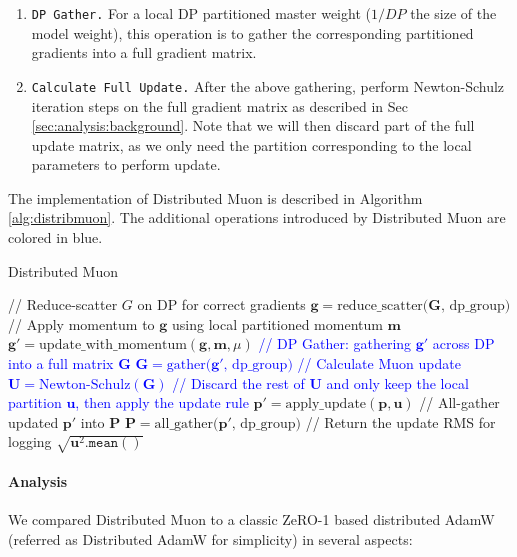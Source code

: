 \begin{enumerate}
    \item \texttt{DP Gather.} For a local DP partitioned master weight ($1/DP$ the size of the model weight), this operation is to gather the corresponding partitioned gradients into a full gradient matrix. 
    
    \item \texttt{Calculate Full Update.} After the above gathering, perform Newton-Schulz iteration steps on the full gradient matrix as described in Sec \ref{sec:analysis:background}. Note that we will then discard part of the full update matrix, as we only need the partition corresponding to the local parameters to perform update.
\end{enumerate}


The implementation of Distributed Muon is described in Algorithm \ref{alg:distribmuon}. The additional operations introduced by Distributed Muon are colored in blue.

\begin{algorithm}[t]
\caption{Distributed Muon}
\label{alg:distribmuon}
\begin{algorithmic}[1]
\STATE // Reduce-scatter $G$ on DP for correct gradients
\STATE $\mathbf{g} = \text{reduce\_scatter($\mathbf{G}$, dp\_group)}$ 
\STATE // Apply momentum to $\mathbf{g}$   using local partitioned momentum $\mathbf{m}$
\STATE $\mathbf{g}' = \text{update\_with\_momentum}(\mathbf{g}, \mathbf{m}, \mu)$
\STATE \textcolor{blue}{// DP Gather: gathering $\mathbf{g'}$ across DP into a full matrix $\mathbf{G}$}
\STATE \textcolor{blue}{$\mathbf{G} = \text{gather($\mathbf{g'}$, dp\_group)}$}
\STATE \textcolor{blue}{// Calculate Muon update}
\STATE \textcolor{blue}{$\mathbf{U} = \text{Newton-Schulz}(\mathbf{G})$ }
\STATE \textcolor{blue}{// Discard the rest of $\mathbf{U}$ and only keep the local partition  ${\mathbf{u}}$, then apply the update rule}
\STATE $\mathbf{p}' = \text{apply\_update}(\mathbf{p}, \mathbf{u})$
\STATE // All-gather updated $\mathbf{p'}$ into $\mathbf{P}$ 
\STATE $\mathbf{P} = \text{all\_gather($\mathbf{p'}$, dp\_group)}$
\STATE // Return the update RMS for logging
\RETURN $\sqrt{\mathbf{u}^2.\texttt{mean}()}$ 
\end{algorithmic}
\end{algorithm}


\paragraph{Analysis}
We compared Distributed Muon to a classic ZeRO-1 based distributed AdamW (referred as Distributed AdamW for simplicity) in several aspects:

